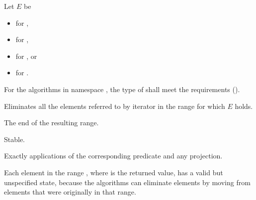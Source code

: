 \begin{itemdescr}
\pnum
Let $E$ be
\begin{itemize}
\item {} for ,
\item {} for ,
\item {} for , or
\item {} for .
\end{itemize}

\pnum
\requires
For the algorithms in namespace ,
the type of 
shall meet the  requirements ().

\pnum
\effects
Eliminates all the elements referred to by iterator 
in the range  for which $E$ holds.

\pnum
\returns
The end of the resulting range.

\pnum
\remarks
Stable.

\pnum
\complexity
Exactly  applications
of the corresponding predicate and any projection.

\pnum
\begin{note}
Each element in the range ,
where  is the returned value,
has a valid but unspecified state,
because the algorithms can eliminate elements
by moving from elements that were originally in that range.
\end{note}
\end{itemdescr}

